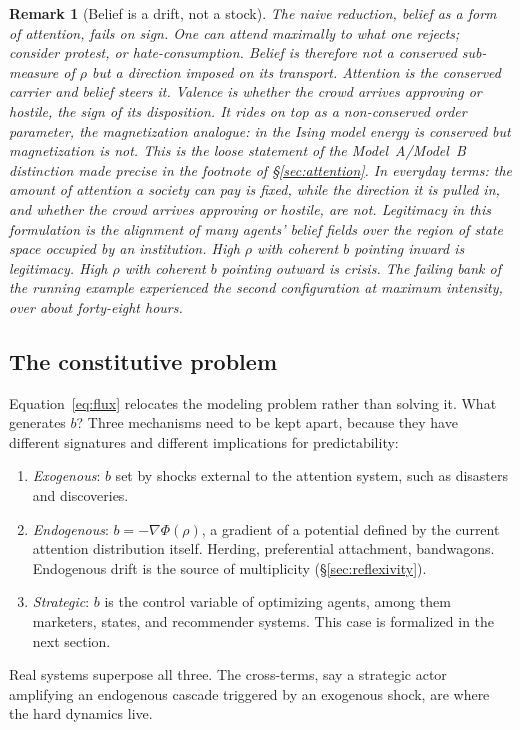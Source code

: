 \documentclass[11pt]{article}
\newtheorem{remark}{Remark}
\begin{document}
\begin{remark}[Belief is a drift, not a stock]
The naive reduction, belief as a form of attention, fails on sign. One can attend maximally to what one rejects; consider protest, or hate-consumption. Belief is therefore not a conserved sub-measure of $\rho$ but a \emph{direction} imposed on its transport. Attention is the conserved carrier and belief steers it. Valence is whether the crowd arrives approving or hostile, the sign of its disposition. It rides on top as a non-conserved order parameter, the magnetization analogue: in the Ising model energy is conserved but magnetization is not. This is the loose statement of the Model~A/Model~B distinction made precise in the footnote of \S\ref{sec:attention}. In everyday terms: the amount of attention a society can pay is fixed, while the direction it is pulled in, and whether the crowd arrives approving or hostile, are not. Legitimacy in this formulation is the alignment of many agents' belief fields over the region of state space occupied by an institution. High $\rho$ with coherent $b$ pointing inward is legitimacy. High $\rho$ with coherent $b$ pointing outward is crisis. The failing bank of the running example experienced the second configuration at maximum intensity, over about forty-eight hours.
\end{remark}

\subsection{The constitutive problem}

Equation~\eqref{eq:flux} relocates the modeling problem rather than solving it. What generates $b$? Three mechanisms need to be kept apart, because they have different signatures and different implications for predictability:
\begin{enumerate}[label=(\roman*),itemsep=2pt]
\item \emph{Exogenous}: $b$ set by shocks external to the attention system, such as disasters and discoveries.
\item \emph{Endogenous}: $b = -\nabla \Phi(\rho)$, a gradient of a potential defined by the current attention distribution itself. Herding, preferential attachment, bandwagons. Endogenous drift is the source of multiplicity (\S\ref{sec:reflexivity}).
\item \emph{Strategic}: $b$ is the control variable of optimizing agents, among them marketers, states, and recommender systems. This case is formalized in the next section.
\end{enumerate}
Real systems superpose all three. The cross-terms, say a strategic actor amplifying an endogenous cascade triggered by an exogenous shock, are where the hard dynamics live.
\end{document}
